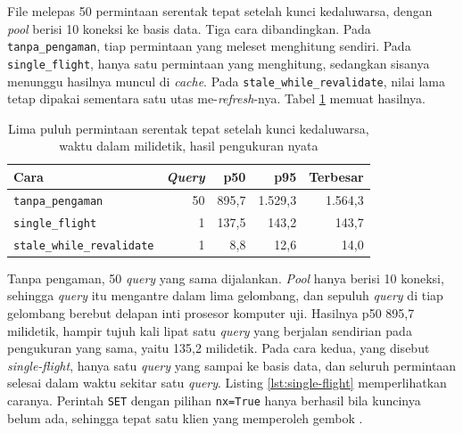 File  melepas 50 permintaan serentak
tepat setelah kunci kedaluwarsa, dengan \textit{pool} berisi 10 koneksi ke basis data. Tiga
cara dibandingkan. Pada \texttt{tanpa\_pengaman}, tiap permintaan yang meleset
menghitung sendiri. Pada \texttt{single\_flight}, hanya satu permintaan yang
menghitung, sedangkan sisanya menunggu hasilnya muncul di \textit{cache}. Pada
\texttt{stale\_while\_revalidate}, nilai lama tetap dipakai sementara satu utas
me-\textit{refresh}-nya. Tabel \ref{tab:hasil-stampede} memuat hasilnya.

\begin{table}[!htb]
  \centering
  \caption{Lima puluh permintaan serentak tepat setelah kunci kedaluwarsa,
           waktu dalam milidetik, hasil pengukuran nyata}
  \label{tab:hasil-stampede}
  \begin{tabularx}{\textwidth}{Xrrrr}
    \hline
    \textbf{Cara} & \textbf{\textit{Query}} & \textbf{p50} & \textbf{p95} & \textbf{Terbesar} \\
    \hline
    \texttt{tanpa\_pengaman} & 50 & 895,7 & 1.529,3 & 1.564,3 \\
    \hline
    \texttt{single\_flight} & 1 & 137,5 & 143,2 & 143,7 \\
    \hline
    \texttt{stale\_while\_revalidate} & 1 & 8,8 & 12,6 & 14,0 \\
    \hline
  \end{tabularx}
\end{table}

Tanpa pengaman, 50 \textit{query} yang sama dijalankan. \textit{Pool} hanya berisi 10
koneksi, sehingga \textit{query} itu mengantre dalam lima gelombang, dan sepuluh \textit{query}
di tiap gelombang berebut delapan inti prosesor komputer uji. Hasilnya p50
895,7 milidetik, hampir tujuh kali lipat satu \textit{query} yang berjalan sendirian
pada pengukuran yang sama, yaitu 135,2 milidetik. Pada cara kedua, yang disebut
\textit{single-flight}, hanya satu \textit{query} yang sampai ke basis data, dan seluruh
permintaan selesai dalam waktu sekitar satu \textit{query}. Listing
\ref{lst:single-flight} memperlihatkan caranya. Perintah \texttt{SET} dengan
pilihan \texttt{nx=True} hanya berhasil bila kuncinya belum ada, sehingga
tepat satu klien yang memperoleh gembok \cite{redis-set}.

